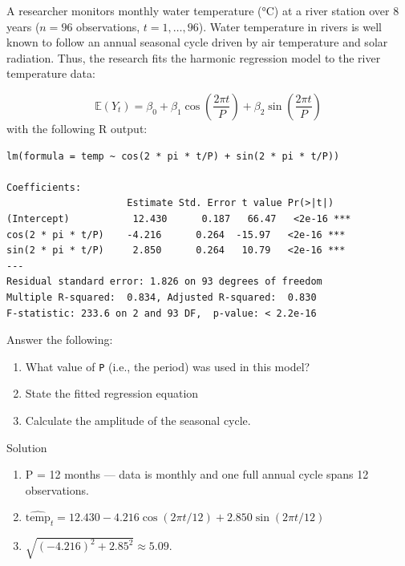 \documentclass[
  letterpaper,
  DIV=11,
  numbers=noendperiod,
  oneside]{scrartcl}
\providecommand{\tightlist}{%
  \setlength{\itemsep}{0pt}\setlength{\parskip}{0pt}}\usepackage{longtable,booktabs,array}
\begin{document}
\begin{tcolorbox}
\end{tcolorbox}

\begin{tcolorbox}[enhanced jigsaw, colframe=quarto-callout-warning-color-frame, toptitle=1mm, toprule=.15mm, bottomtitle=1mm, titlerule=0mm, coltitle=black, left=2mm, rightrule=.15mm, arc=.35mm, colback=white, title={Task 4}, breakable, opacitybacktitle=0.6, opacityback=0, bottomrule=.15mm, leftrule=.75mm, colbacktitle=quarto-callout-warning-color!10!white]

A researcher monitors monthly water temperature (°C) at a river station
over 8 years (\(n=96\) observations, \(t = 1,\ldots,96\)). Water
temperature in rivers is well known to follow an annual seasonal cycle
driven by air temperature and solar radiation. Thus, the research fits
the harmonic regression model to the river temperature data:

\[
\mathbb{E}(Y_t) = \beta_0 + \beta_1\cos\left(\frac{2\pi t}{P}\right) + \beta_2\sin\left(\frac{2\pi t}{P}\right)
\] with the following R output:

\begin{verbatim}
lm(formula = temp ~ cos(2 * pi * t/P) + sin(2 * pi * t/P))

Coefficients:
                     Estimate Std. Error t value Pr(>|t|)    
(Intercept)           12.430      0.187   66.47   <2e-16 ***
cos(2 * pi * t/P)    -4.216      0.264  -15.97   <2e-16 ***
sin(2 * pi * t/P)     2.850      0.264   10.79   <2e-16 ***
---
Residual standard error: 1.826 on 93 degrees of freedom
Multiple R-squared:  0.834, Adjusted R-squared:  0.830 
F-statistic: 233.6 on 2 and 93 DF,  p-value: < 2.2e-16
\end{verbatim}

Answer the following:

\begin{enumerate}
\def\labelenumi{\arabic{enumi}.}
\tightlist
\item
  What value of \texttt{P} (i.e., the period) was used in this model?
\item
  State the fitted regression equation
\item
  Calculate the amplitude of the seasonal cycle.
\end{enumerate}

Solution

\begin{enumerate}
\def\labelenumi{\arabic{enumi}.}
\tightlist
\item
  P = 12 months --- data is monthly and one full annual cycle spans 12
  observations.
\item
  \(\widehat{\text{temp}}_t = 12.430 - 4.216\cos(2\pi t/12) + 2.850\sin(2\pi t/12)\)
\item
  \(\sqrt{(-4.216)^2+2.85^2} \approx 5.09.\)
\end{enumerate}

\end{tcolorbox}
\end{document}
